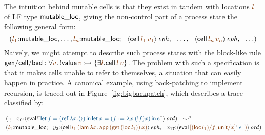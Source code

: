 The intuition behind mutable cells is that they exist in 
tandem with locations $\lf{l}$ of LF type ${\sf mutable\_loc}$,
giving the non-control part of a process state the following
general form:
\[\left(\lf{l_1}{:}{\sf mutable\_loc},\ldots,\lf{l_n}{:}{\sf mutable\_loc};
  ~~ \iseph{\susp{{\sf cell}\,\lf{l_1}\,\lf{v_1}}}, 
  ~~ \ldots, 
  ~~ \iseph{\susp{{\sf cell}\,\lf{l_n}\,\lf{v_n}}}, 
  ~~ \ldots\right)\]
%
Naively, we might attempt to describe such process 
states with the block-like rule 
${\sf gen/cell/bad} : \forall \lf{v}.\, {!}{\sf
  value}\,\lf{v} \lefti \{ \exists \lf{l}. {\sf cell}\,\lf{l}\,\lf{v}
\}$. The problem with such a specification is that it makes 
cells unable to refer to themselves, a situation that can easily
happen in practice. A canonical example, using back-patching to
implement recursion, is traced out 
in Figure~\ref{fig:bigbackpatch}, which
describes a trace classified by:

\vspace{-10pt}

{\small\begin{align*}
&
\left(\cdot; ~~
 x_0{:}\istrue{\susp{{\sf eval}\,
  \interp{{\sf let}\,f = ({\sf ref}\,\lambda x. \langle\rangle) \,{\sf in}\,
          {\sf let}\,x = (f := \lambda x. ({!}f) x)\,{\sf in}\,e}}}
\right) ~~ \leadsto^*
\\
& 
\left(
\lf{l_1}{:}{\sf mutable\_loc}; ~~
y_2{:}\iseph{\susp{{\sf cell}\,\lf{l_1}\,
  \lf{({\sf lam}\,\lambda x.\,{\sf app}\,({\sf get}\,({\sf loc}\,l_1))\,x)}}},
 ~~
x_{17}{:}\istrue{\susp{{\sf eval}\,
  \lf{[({\sf loc}\,l_1)/f, {\sf unit}/x]\interp{e})}}}
\right)
\end{align*}}

\vspace{-10pt}


